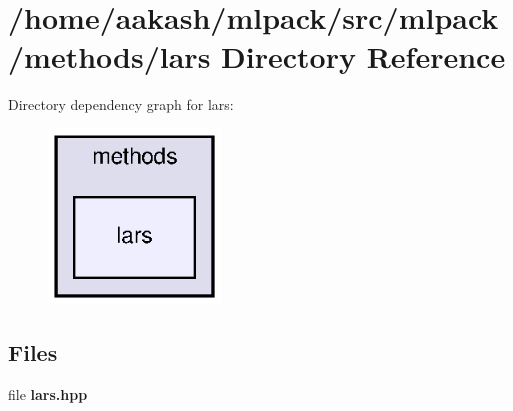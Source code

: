 \section{/home/aakash/mlpack/src/mlpack/methods/lars Directory Reference}
\label{dir_339a92b69de992c476f69912c4933ab8}
Directory dependency graph for lars\+:
\nopagebreak
\begin{figure}[H]
\begin{center}
\leavevmode
\includegraphics[width=130pt]{dir_339a92b69de992c476f69912c4933ab8_dep}
\end{center}
\end{figure}
\subsection*{Files}
\begin{DoxyCompactItemize}
\item 
file \textbf{ lars.\+hpp}
\end{DoxyCompactItemize}
